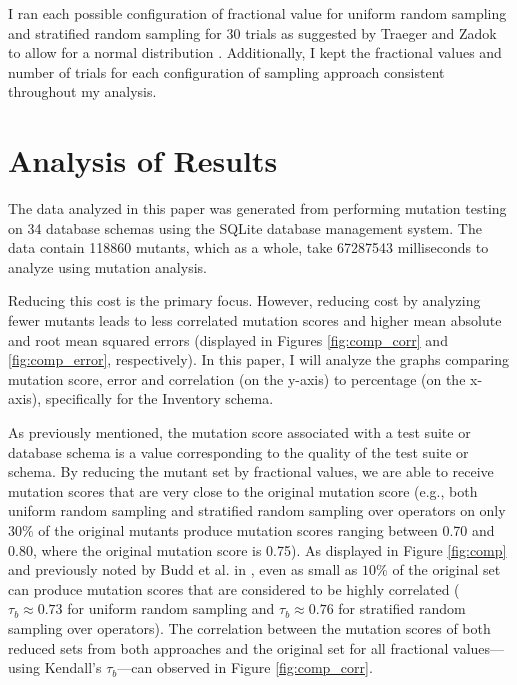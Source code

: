 \documentclass[conference]{IEEEtran}
\begin{document}
I ran each possible configuration of fractional value for uniform random sampling and stratified random sampling
for 30 trials as suggested by Traeger and Zadok to allow for a normal distribution \cite{traeger2008nine}. Additionally,
I kept the fractional values and number of trials for each configuration of sampling approach consistent throughout
my analysis.

\begin{figure*}[!hb]
\centering
{}
\hfil
{}
\caption{The correlation of mutation scores across percentages for the uniform random sampling and stratified random sampling
across operators approaches, specifically for the Inventory schema.}
\label{fig:comp_corr}
\end{figure*}

\section{Analysis of Results}
The data analyzed in this paper was generated from performing mutation testing on
34 database schemas using the SQLite database management system. The data
contain 118860 mutants, which as a whole, take 67287543 milliseconds to analyze using mutation analysis.

Reducing this cost is the primary focus. However, reducing cost by analyzing fewer mutants
leads to less correlated mutation scores and higher mean absolute and root mean squared errors (displayed
in Figures \ref{fig:comp_corr} and \ref{fig:comp_error}, respectively). In this paper, I will
analyze the graphs comparing mutation score, error and correlation (on the y-axis) to percentage (on the x-axis),
specifically for the Inventory schema.

As previously mentioned, the mutation score associated with a test suite or database schema is a value
corresponding to the quality of the test suite or schema. By reducing the mutant set by fractional values,
we are able to receive mutation scores that are very close to the original mutation score (e.g., both uniform random sampling
and stratified random sampling over operators on only $30\%$ of the original mutants produce mutation scores ranging between 0.70 and 0.80, where the
original mutation score is 0.75). As displayed
in Figure \ref{fig:comp} and previously noted by Budd et al. in \cite{budd1980mutation}, even as small
as $10\%$ of the original set can produce mutation scores that are considered to be highly correlated
($\tau_b \approx 0.73$ for uniform random sampling and $\tau_b \approx 0.76$ for stratified random sampling over operators).
The correlation between the mutation scores of both reduced sets from both approaches and the original set for all fractional values---using Kendall's $\tau_b$---can
observed in Figure \ref{fig:comp_corr}.
\end{document}
